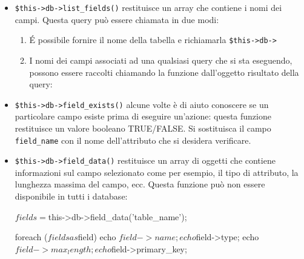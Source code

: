 \begin{itemize}
\item \verb|$this->db->list_fields()| restituisce un array che contiene i nomi dei campi. Questa query può essere chiamata in due modi:

\begin{enumerate}
\item \'E possibile fornire il nome della tabella e richiamarla \verb|$this->db->|


\item I nomi dei campi associati ad una qualsiasi query che si sta eseguendo, possono essere raccolti chiamando la funzione dall'oggetto risultato della query:

\end{enumerate}

\item \verb|$this->db->field_exists()| alcune volte è di aiuto conoscere se un particolare campo esiste prima di eseguire un'azione: questa funzione restituisce un valore booleano TRUE/FALSE. Si sostituisca il campo \verb|field_name| con il nome dell'attributo che si desidera verificare.


\item \verb|$this->db->field_data()| restituisce un array di oggetti che contiene informazioni sul campo selezionato come per esempio, il tipo di attributo, la lunghezza massima del campo, ecc. Questa funzione può non essere disponibile in tutti i database:

\begin{code}
$fields = $this->db->field_data('table_name');

foreach ($fields as $field)
{
   echo $field->name;
   echo $field->type;
   echo $field->max_length;
   echo $field->primary_key;
}
\end{code}


\end{itemize}
